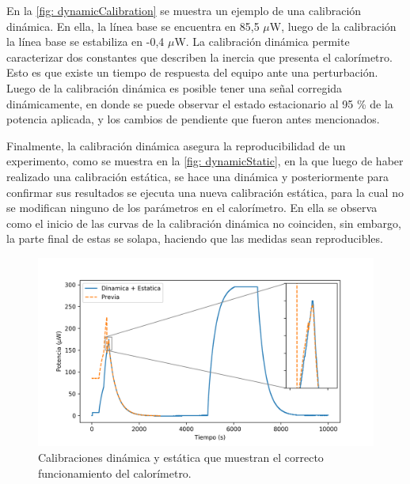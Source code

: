 	En la \autoref{fig: dynamicCalibration} se muestra un ejemplo de una calibración dinámica. En ella, la línea base se encuentra en 85,5 $\mu$W, luego de la calibración la línea base se estabiliza en -0,4 $\mu$W. La calibración dinámica permite caracterizar dos constantes que describen la inercia que presenta el calorímetro. Esto es que existe un tiempo de respuesta del equipo ante una perturbación. Luego de la calibración dinámica es posible tener una señal corregida dinámicamente, en donde se puede observar el estado estacionario al 95 \% de la potencia aplicada, y los cambios de pendiente que fueron antes mencionados.
	
	Finalmente, la calibración dinámica asegura la reproducibilidad de un experimento, como se muestra en la \autoref{fig: dynamicStatic}, en la que luego de haber realizado una calibración estática, se hace una dinámica y posteriormente para confirmar sus resultados se ejecuta una nueva calibración estática, para la cual no se modifican ninguno de los parámetros en el calorímetro. En ella se observa como el inicio de las curvas de la calibración dinámica no coinciden, sin embargo, la parte final de estas se solapa, haciendo que las medidas sean reproducibles.
	\begin{figure}[h]
		\centering
		\includegraphics[width=\linewidth]{../Data/ElectricalCalibrations/Both}
		\caption{Calibraciones dinámica y estática que muestran el correcto funcionamiento del calorímetro.}
		\label{fig: dynamicStatic}
	\end{figure}
	